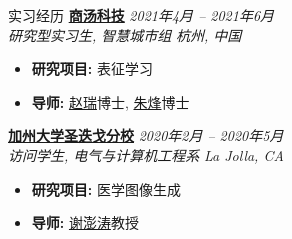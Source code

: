 \documentclass[a4paper]{resume} %
\begin{document}
\begin{rSection}{实习经历}
{\bf \href{https://www.sensetime.com/en}{商汤科技}} \hfill{\it 2021年4月 -- 2021年6月}\\
{\it 研究型实习生, 智慧城市组} \hfill{\it 杭州, 中国}
\begin{itemize}
    \item {\bf 研究项目:} 表征学习
 	\item {\bf 导师:} \href{http://zhaorui.xyz/}{赵瑞}博士, \href{https://zhufengx.github.io/}{朱烽}博士
\end{itemize}

{\bf \href{https://ucsd.edu}{加州大学圣迭戈分校}} \hfill{\it 2020年2月 -- 2020年5月}\\
{\it 访问学生, 电气与计算机工程系} \hfill{\it La Jolla, CA}
\begin{itemize}
    \item {\bf 研究项目:} 医学图像生成
 	\item {\bf 导师:} \href{https://sites.google.com/site/pengtaoxie2008}{谢澎涛}教授
\end{itemize}

\end{rSection}
\end{document}
